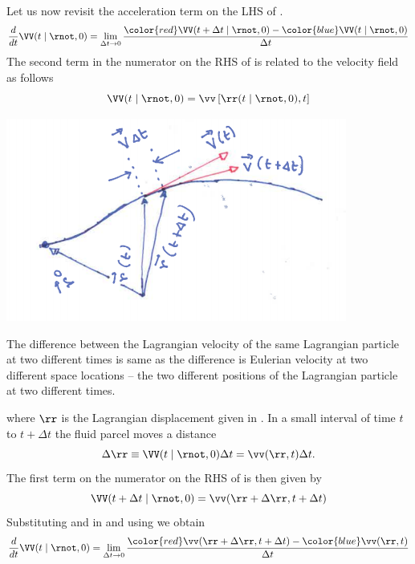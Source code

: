 Let us now revisit the acceleration term on the LHS of  . 
\begin{equation}
\frac{d}{dt} \VV(t\mid\rnot,0) = 
\lim_{\Delta t\to 0}
\frac{
{\color{red}\VV(t+\Delta t\mid\rnot,0)} -
{\color{blue} \VV(t\mid\rnot,0)}
}
{\Delta t}
\label{A2.1:euler1}
\end{equation}
The {\color{blue} second term} in the numerator on the RHS of  is
related to the velocity field as follows
\begin{equation}
\VV(t\mid\rnot,0)= \vv\left[\rr(t\mid\rnot,0),t\right] 
\label{A2.1:euler2}
\end{equation}
\begin{marginfigure}
\includegraphics{figures/Drdt.png}
\caption{The difference between the Lagrangian velocity of the same
  Lagrangian particle at two different times is same as the difference
is Eulerian velocity at two different space locations -- the two
different positions of the Lagrangian particle at two different times.}
\label{fig:Drdt}
\end{marginfigure}
where $\rr$ is the Lagrangian displacement given in
. 
In a small interval of time $t$ to $t+\Delta t$ the fluid parcel moves a
distance 
\begin{equation}
\Delta\rr \equiv \VV(t\mid \rnot,0)\Delta t =
\vv(\rr,t) \Delta t\/.
\label{A2.1:dr}
\end{equation}
 The {\color{red}first term}
on the numerator on the RHS of  is then given by 
\begin{equation}
\VV(t+\Delta t\mid\rnot,0) = \vv(\rr+\Delta \rr,t+\Delta t) 
\label{A2.1:euler3}
\end{equation}
Substituting  and  in 
and using  we obtain
\begin{equation}
\frac{d}{dt} \VV(t\mid\rnot,0) =
 \lim_{\Delta t\to0}
\frac{
{\color{red}\vv(\rr+\Delta \rr,t+\Delta t)} -
{\color{blue} \vv(\rr,t)}
}
{\Delta t}
\label{A2.1:euler4}
\end{equation}

